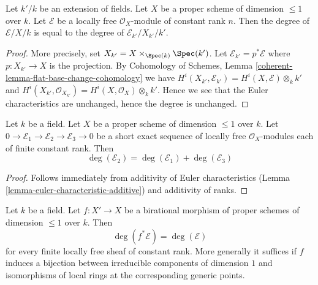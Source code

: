 \begin{lemma}
\label{lemma-degree-base-change}
Let $k'/k$ be an extension of fields. Let $X$ be a proper scheme of
dimension $\leq 1$ over $k$. Let $\mathcal{E}$ be a locally free
$\mathcal{O}_X$-module of constant rank $n$. Then the degree of
$\mathcal{E}/X/k$ is equal to the degree of
$\mathcal{E}_{k'}/X_{k'}/k'$.
\end{lemma}

\begin{proof}
More precisely, set $X_{k'} = X \times_{\Spec(k)} \Spec(k')$.
Let $\mathcal{E}_{k'} = p^*\mathcal{E}$ where $p : X_{k'} \to X$
is the projection. By
Cohomology of Schemes, Lemma \ref{coherent-lemma-flat-base-change-cohomology}
we have
$H^i(X_{k'}, \mathcal{E}_{k'}) = H^i(X, \mathcal{E}) \otimes_k k'$
and
$H^i(X_{k'}, \mathcal{O}_{X_{k'}}) = H^i(X, \mathcal{O}_X) \otimes_k k'$.
Hence we see that the Euler characteristics are unchanged, hence the
degree is unchanged.
\end{proof}

\begin{lemma}
\label{lemma-degree-additive}
Let $k$ be a field. Let $X$ be a proper scheme of dimension $\leq 1$
over $k$. Let $0 \to \mathcal{E}_1 \to \mathcal{E}_2 \to \mathcal{E}_3 \to 0$
be a short exact sequence of locally free $\mathcal{O}_X$-modules
each of finite constant rank. Then
$$
\deg(\mathcal{E}_2) = \deg(\mathcal{E}_1) + \deg(\mathcal{E}_3)
$$
\end{lemma}

\begin{proof}
Follows immediately from additivity of Euler characteristics
(Lemma \ref{lemma-euler-characteristic-additive})
and additivity of ranks.
\end{proof}

\begin{lemma}
\label{lemma-degree-birational-pullback}
Let $k$ be a field. Let $f : X' \to X$ be a birational morphism of
proper schemes of dimension $\leq 1$ over $k$. Then
$$
\deg(f^*\mathcal{E}) = \deg(\mathcal{E})
$$
for every finite locally free sheaf of constant rank. More generally
it suffices if $f$ induces a bijection between irreducible components
of dimension $1$ and isomorphisms of local rings at the corresponding
generic points.
\end{lemma}


